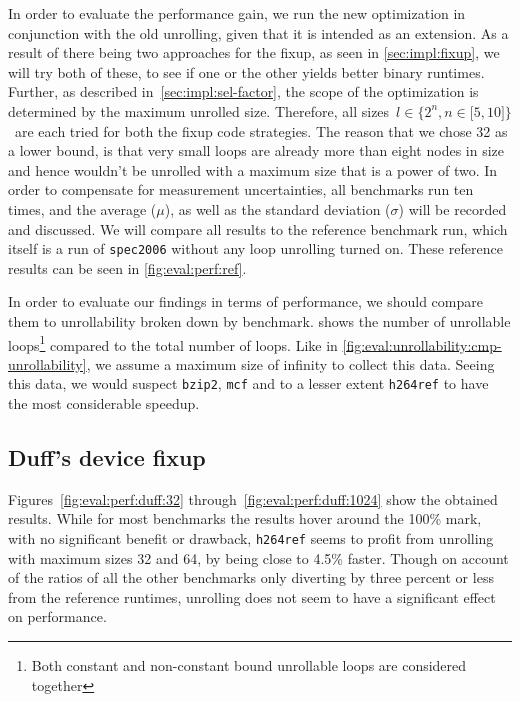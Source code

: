 In order to evaluate the performance gain, we run the new optimization in conjunction with the old unrolling, given that it is intended as an extension.
As a result of there being two approaches for the fixup, as seen in \cref{sec:impl:fixup}, we will try both of these, to see if one or the other yields better binary runtimes.
Further, as described in~\cref{sec:impl:sel-factor}, the scope of the optimization is determined by the maximum unrolled size.
Therefore, all sizes~$l \in \{2^n, n \in \lbrack 5, 10 \rbrack \}$~are each tried for both the fixup code strategies.
The reason that we chose 32 as a lower bound, is that very small loops are already more than eight nodes in size and hence wouldn't be unrolled with a maximum size that is a power of two.
In order to compensate for measurement uncertainties, all benchmarks run ten times, and the average ($\mu$), as well as the standard deviation ($\sigma$) will be recorded and discussed.
We will compare all results to the reference benchmark run, which itself is a run of \texttt{spec2006} without any loop unrolling turned on.
These reference results can be seen in \cref{fig:eval:perf:ref}.

In order to evaluate our findings in terms of performance, we should compare them to unrollability broken down by benchmark.
 shows the number of unrollable loops\footnote{Both constant and non-constant bound unrollable loops are considered together} compared to the total number of loops.
Like in \cref{fig:eval:unrollability:cmp-unrollability}, we assume a maximum size of infinity to collect this data.
Seeing this data, we would suspect \texttt{bzip2}, \texttt{mcf} and to a lesser extent \texttt{h264ref} to have the most considerable speedup.





\subsection{Duff's device fixup}\label{sec:eval:perf:duff}

Figures~\ref{fig:eval:perf:duff:32} through~\ref{fig:eval:perf:duff:1024} show the obtained results.
While for most benchmarks the results hover around the 100\% mark, with no significant benefit or drawback, \texttt{h264ref} seems to profit from unrolling with maximum sizes 32 and 64, by being close to 4.5\% faster.
Though on account of the ratios of all the other benchmarks only diverting by three percent or less from the reference runtimes, unrolling does not seem to have a significant effect on performance.

